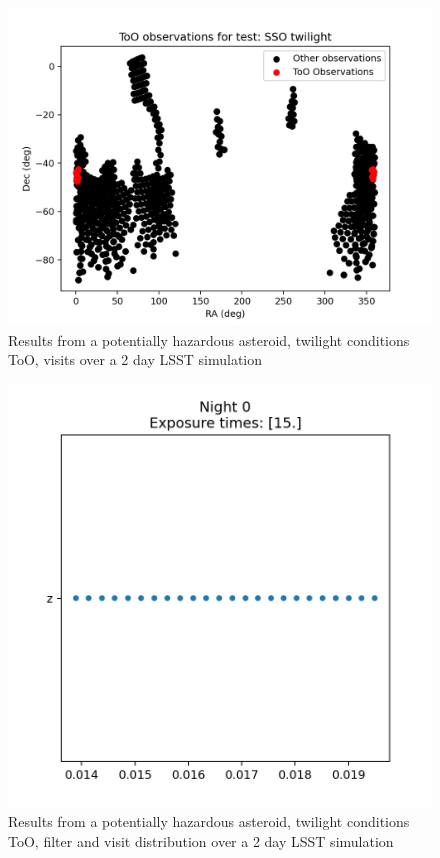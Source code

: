 \begin{figure}
    \centering
    \includegraphics[width=\linewidth]{figures/validationTests/SVRequired/PHATwiPosition.png}
    \caption{Results from a potentially hazardous asteroid, twilight conditions ToO, visits over a 2 day LSST simulation}
    \label{fig:PHATwiPositionResult}
\end{figure}

\begin{figure}
    \centering
    \includegraphics[width=\linewidth]{figures/validationTests/SVRequired/PHATwiFilterPlot.png}
    \caption{Results from a potentially hazardous asteroid, twilight conditions ToO, filter and visit distribution over a 2 day LSST simulation}
    \label{fig:PHATwiFilterResult}
\end{figure}
\newpage



